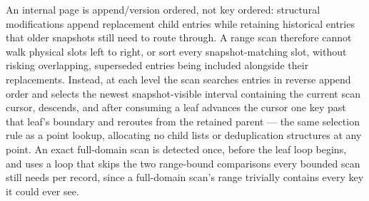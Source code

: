 \documentclass[11pt]{article}
\begin{document}
An internal page is append/version ordered, not key ordered: structural
modifications append replacement child entries while retaining historical entries
that older snapshots still need to route through. A range scan therefore cannot
walk physical slots left to right, or sort every snapshot-matching slot, without
risking overlapping, superseded entries being included alongside their
replacements. Instead, at each level the scan searches entries in reverse append
order and selects the newest snapshot-visible interval containing the current scan
cursor, descends, and after consuming a leaf advances the cursor one key past that
leaf's boundary and reroutes from the retained parent --- the same selection rule as
a point lookup, allocating no child lists or deduplication structures at any point.
An exact full-domain scan is detected once, before the leaf loop begins, and uses a
loop that skips the two range-bound comparisons every bounded scan still needs per
record, since a full-domain scan's range trivially contains every key it could ever
see.
\end{document}
